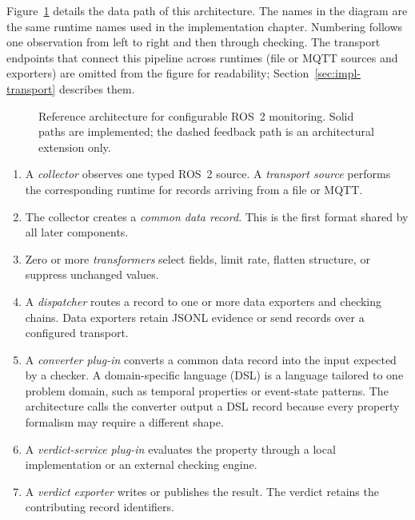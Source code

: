 Figure~\ref{fig:reference-architecture} details the data path of this
architecture. The names in the diagram are the same runtime names used in the
implementation chapter. Numbering follows one observation from left to right
and then through checking. The transport endpoints that connect this pipeline
across runtimes (file or MQTT sources and exporters) are omitted from the
figure for readability;
Section~\ref{sec:impl-transport} describes them.

\begin{figure}[htbp]
  \centering
  \resizebox{\textwidth}{!}{}
  \caption{Reference architecture for configurable ROS~2 monitoring. Solid
  paths are implemented; the dashed feedback path is an architectural
  extension only.}
  \label{fig:reference-architecture}
\end{figure}

\begin{enumerate}
  \item A \emph{collector} observes one typed ROS~2 source. A
  \emph{transport source} performs the corresponding runtime for records arriving
  from a file or MQTT.

  \item The collector creates a \emph{common data record}. This is the first
  format shared by all later components.

  \item Zero or more \emph{transformers} select fields, limit rate, flatten
  structure, or suppress unchanged values.

  \item A \emph{dispatcher} routes a record to one or more data exporters and
  checking chains. Data exporters retain JSONL evidence or send records over a
  configured transport.

  \item A \emph{converter plug-in} converts a common data record into the input
  expected by a checker. A domain-specific language (DSL) is a language tailored
  to one problem domain, such as temporal properties or event-state patterns.
  The architecture calls the converter output a DSL record because every
  property formalism may require a different shape.

  \item A \emph{verdict-service plug-in} evaluates the property through a local
  implementation or an external checking engine.

  \item A \emph{verdict exporter} writes or publishes the result. The verdict
  retains the contributing record identifiers.
\end{enumerate}

